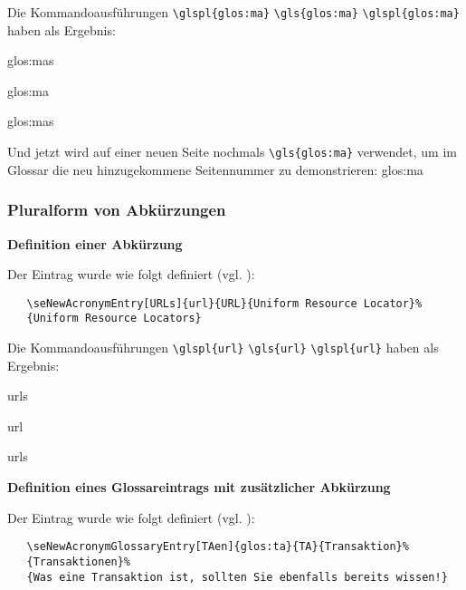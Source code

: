 Die Kommandoausf\"uhrungen \verb+\glspl{glos:ma}+ \verb+\gls{glos:ma}+  \verb+\glspl{glos:ma}+ haben als 
Ergebnis:

\begin{seList}
\item \glspl{glos:ma}
\item \gls{glos:ma}
\item \glspl{glos:ma}
\end{seList}

\newpage
Und jetzt wird auf einer neuen Seite nochmals \verb+\gls{glos:ma}+ verwendet, um im Glossar die neu hinzugekommene 
Seitennummer zu demonstrieren: \gls{glos:ma}

\subsubsection{Pluralform von Abk\"urzungen}

\textbf{\textsf{Definition einer Abk\"urzung}}

Der Eintrag wurde wie folgt definiert (vgl. \dateiAbk{}):

\vspace{-\baselineskip}
\begin{verbatim}
   \seNewAcronymEntry[URLs]{url}{URL}{Uniform Resource Locator}%
   {Uniform Resource Locators}
\end{verbatim}
\vspace{-\baselineskip}

Die Kommandoausf\"uhrungen \verb+\glspl{url}+ \verb+\gls{url}+  \verb+\glspl{url}+ haben als 
Ergebnis:

\begin{seList}
\item \glspl{url}
\item \gls{url}
\item \glspl{url}
\end{seList}

\seVsd
\textbf{\textsf{Definition eines Glossareintrags mit zus\"atzlicher Abk\"urzung}}

Der Eintrag wurde wie folgt definiert (vgl. \dateiAbk{}):

\vspace{-\baselineskip}
\begin{verbatim}
   \seNewAcronymGlossaryEntry[TAen]{glos:ta}{TA}{Transaktion}%
   {Transaktionen}%
   {Was eine Transaktion ist, sollten Sie ebenfalls bereits wissen!}
\end{verbatim}
\vspace{-\baselineskip}


